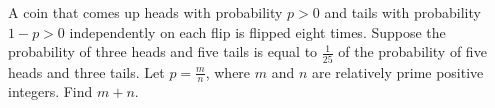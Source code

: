 A coin that comes up heads with probability $ p > 0$ and tails with probability $ 1-p > 0$ independently on each flip is flipped eight times. Suppose the probability of three heads and five tails is equal to $ \frac{1}{25}$ of the probability of five heads and three tails. Let $ p = \frac{m}{n}$, where $ m$ and $ n$ are relatively prime positive integers. Find $ m+n$.